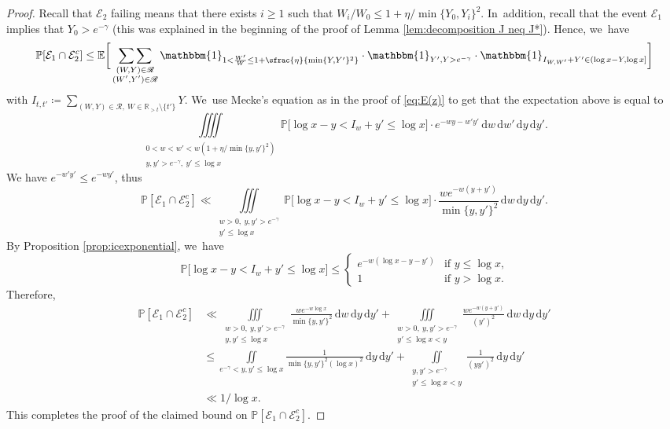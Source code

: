 \documentclass[JEP,XML,SOM,Unicode,published]{cedram}
\newcommand{\RR}{\mathbb{R}}
\newcommand{\PP}{\mathbb{P}}
\newcommand{\EE}{\mathbb{E}}
\newcommand{\dee}{\,\mathrm{d}}
\newcommand{\one}{\mathbbm{1}}
\newcommand{\EC}{\mathcal{E}}
\newcommand{\RS}{\mathscr{R}}
\newcommand{\bg}{\big}
\newcommand{\bggg}{\bigg}
\theoremstyle{plain}
\theoremstyle{definition}
\begin{document}
\begin{proof} Recall that $\EC_2$ failing means that there exists $i\ge1$ such that $W_i/W_0\le 1+\eta/\min\{Y_0, Y_i\}^2$. In~addition, recall that the event $\EC_1$ implies that $Y_0 > e^{-\gamma}$ (this was explained in the beginning of the proof of Lemma \ref{lem:decomposition J neq J*}). Hence, we~have
\[
\PP[\EC_1 \cap \EC_2^c] \le
\EE\bggg[ \mathop{\sum\sum}_{\substack{(W,Y) \in \RS \\ (W',Y')\in\RS}} \one_{1< \frac{W'}{W} \le 1+\sfrac{\eta}{\min\{Y,Y'\}^2}}\cdot\one_{Y',Y>e^{-\gamma}} \cdot \one_{I_{W, W'} + Y'\in(\log x-Y,\log x]} \bggg]
\]
with $I_{t, t'} \coloneqq \sum_{(W, Y) \in \RS,\ W \in \RR_{>t}\setminus\{t'\}} Y$. We~use Mecke's equation as in the proof of \eqref{eq:E(z)} to get that the expectation above is equal to
\[
\iiiint\limits_{\substack{0 < w < w' < w(1+\eta/\min\{y,y'\}^2)\\ y, y' > e^{-\gamma},\ y'\le \log x}} \PP\bg[\log x - y<I_w + y' \le \log x\bg]\cdot e^{-wy-w'y'}
\dee w\dee w'\dee y\dee y'.
\]
We have $e^{-w'y'}\le e^{-wy'}$, thus
\[
\PP[\EC_1 \cap \EC_2^c] \ll
\iiint\limits_{\substack{w>0,\ y, y' > e^{-\gamma} \\ y'\le \log x}}
\PP\bg[\log x - y<I_w + y' \le \log x\bg]\cdot \frac{we^{-w(y+y')}}{\min\{y,y'\}^2} \dee w\dee y\dee y'.
\]
By Proposition \ref{prop:icexponential}, we~have
\[
\PP\bg[\log x - y<I_w + y' \le \log x\bg] \le \begin{cases}
e^{-w(\log x - y-y')}&\text{if $y \le \log x$,} \\
1 & \text{if $y > \log x$.}
\end{cases}
\]
Therefore,
\begin{align*}
\PP[\EC_1 \cap \EC_2^c]
&\ll \iiint\limits_{\substack{w>0,\ y, y' > e^{-\gamma} \\ y,y'\le \log x}}
\frac{we^{-w\log x}}{\min\{y,y'\}^2}\dee w\dee y\dee y'
+\iiint\limits_{\substack{w>0,\ y, y' > e^{-\gamma} \\ y'\le \log x<y}}
\frac{we^{-w(y+y')}}{(y')^2}\dee w\dee y\dee y' \\
&\le \iint\limits_{e^{-\gamma}<y, y'\le \log x}
\frac{1}{\min\{y,y'\}^2(\log x)^2}\dee y\dee y'
+\iint\limits_{\substack{y, y' > e^{-\gamma} \\ y'\le \log x<y}}
\frac{1}{(yy')^2} \dee y\dee y' \\
&\ll 1/\log x.
\end{align*}
This completes the proof of the claimed bound on $\PP[\EC_1\cap \EC_2^c]$.


\end{proof}
\end{document}
